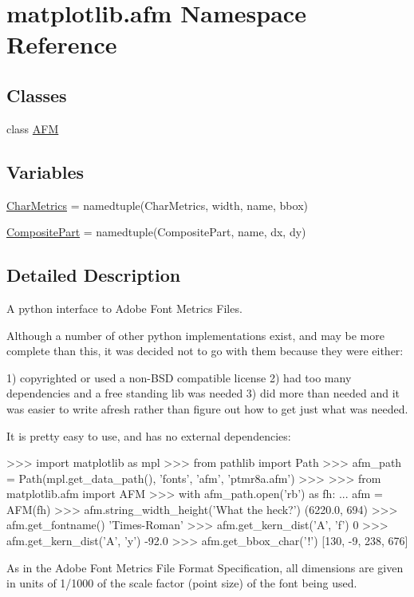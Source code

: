 \hypertarget{namespacematplotlib_1_1afm}{}\section{matplotlib.\+afm Namespace Reference}
\label{namespacematplotlib_1_1afm}
\subsection*{Classes}
\begin{DoxyCompactItemize}
\item 
class \hyperlink{classmatplotlib_1_1afm_1_1AFM}{A\+FM}
\end{DoxyCompactItemize}
\subsection*{Variables}
\begin{DoxyCompactItemize}
\item 
\hyperlink{namespacematplotlib_1_1afm_ae55dadceac9ed5b9c5e9326a76dc7689}{Char\+Metrics} = namedtuple(\textquotesingle{}Char\+Metrics\textquotesingle{}, \textquotesingle{}width, name, bbox\textquotesingle{})
\item 
\hyperlink{namespacematplotlib_1_1afm_a42a94c487f627cf4358a47a8e2008bd2}{Composite\+Part} = namedtuple(\textquotesingle{}Composite\+Part\textquotesingle{}, \textquotesingle{}name, dx, dy\textquotesingle{})
\end{DoxyCompactItemize}


\subsection{Detailed Description}
\begin{DoxyVerb}A python interface to Adobe Font Metrics Files.

Although a number of other python implementations exist, and may be more
complete than this, it was decided not to go with them because they were
either:

1) copyrighted or used a non-BSD compatible license
2) had too many dependencies and a free standing lib was needed
3) did more than needed and it was easier to write afresh rather than
   figure out how to get just what was needed.

It is pretty easy to use, and has no external dependencies:

>>> import matplotlib as mpl
>>> from pathlib import Path
>>> afm_path = Path(mpl.get_data_path(), 'fonts', 'afm', 'ptmr8a.afm')
>>>
>>> from matplotlib.afm import AFM
>>> with afm_path.open('rb') as fh:
...     afm = AFM(fh)
>>> afm.string_width_height('What the heck?')
(6220.0, 694)
>>> afm.get_fontname()
'Times-Roman'
>>> afm.get_kern_dist('A', 'f')
0
>>> afm.get_kern_dist('A', 'y')
-92.0
>>> afm.get_bbox_char('!')
[130, -9, 238, 676]

As in the Adobe Font Metrics File Format Specification, all dimensions
are given in units of 1/1000 of the scale factor (point size) of the font
being used.
\end{DoxyVerb}
 

